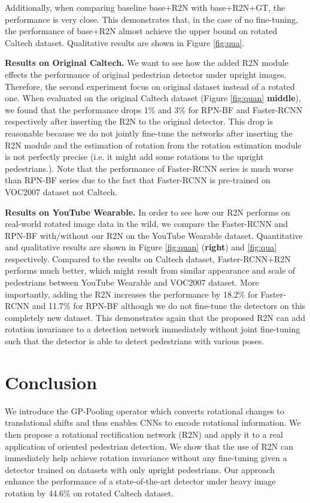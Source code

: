 \documentclass[10pt,twocolumn,letterpaper]{article}
\begin{document}
Additionally, when comparing baseline base+R2N with base+R2N+GT, the performance is very close. This demonstrates that, in the case of no fine-tuning, the performance of base+R2N almost achieve the upper bound on rotated Caltech dataset. Qualitative results are shown in Figure \ref{fig:qua}.

\noindent\textbf{Results on Original Caltech.} We want to see how the added R2N module effects the performance of original pedestrian detector under upright images. Therefore, the second experiment focus on original dataset instead of a rotated one. When evaluated on the original Caltech dataset (Figure \ref{fig:quan} \textbf{middle}), we found that the performance drops 1\% and 3\% for RPN-BF and Faster-RCNN respectively after inserting the R2N to the original detector. This drop is reasonable because we do not jointly fine-tune the networks after inserting the R2N module and the estimation of rotation from the rotation estimation module is not perfectly precise (i.e. it might add some rotations to the upright pedestrians.). Note that the performance of Faster-RCNN series is much worse than RPN-BF series due to the fact that Faster-RCNN is pre-trained on VOC2007 dataset not Caltech.

\noindent\textbf{Results on YouTube Wearable.} In order to see how our R2N performs on real-world rotated image data in the wild, we compare the Faster-RCNN and RPN-BF with/without our R2N on the YouTube Wearable dataset. Quantitative and qualitative results are shown in Figure \ref{fig:quan} (\textbf{right}) and \ref{fig:qua} respectively. Compared to the results on Caltech dataset, Faster-RCNN+R2N performs much better, which might result from similar appearance and scale of pedestrians between YouTube Wearable and VOC2007 dataset. 
More importantly, adding the R2N increases the performance by 18.2\% for Faster-RCNN and 11.7\% for RPN-BF although we do not fine-tune the detectors on this completely new dataset. 
This demonstrates again that the proposed R2N can add rotation invariance to a detection network immediately without joint fine-tuning such that the detector is able to detect pedestrians with various poses. 





\section{Conclusion}

We introduce the GP-Pooling operator which converts rotational changes to translational shifts and thus enables CNNs to encode rotational information. We then propose a rotational rectification network (R2N) and apply it to a real application of oriented pedestrian detection. We show that the use of R2N can immediately help achieve rotation invariance without any fine-tuning given a detector trained on datasets with only upright pedestrians. Our approach enhance the performance of a state-of-the-art detector under heavy image rotation by 44.6\% on rotated Caltech dataset.

{\small


}
\end{document}
